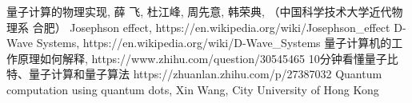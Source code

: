 \documentclass{article}
\begin{document}
\begin{thebibliography}{99}  
量子计算的物理实现, 薛 飞, 杜江峰, 周先意, 韩荣典, （中国科学技术大学近代物理系 合肥）
Josephson effect, https://en.wikipedia.org/wiki/Josephson\_effect
D-Wave Systems, https://en.wikipedia.org/wiki/D-Wave\_Systems
量子计算机的工作原理如何解释, https://www.zhihu.com/question/30545465
10分钟看懂量子比特、量子计算和量子算法 https://zhuanlan.zhihu.com/p/27387032
Quantum computation using quantum dots, Xin Wang, City University of Hong Kong
\end{thebibliography}
\end{document}
